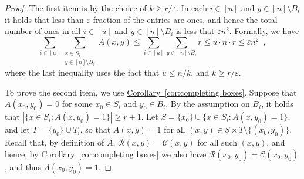 \documentclass[11pt]{article}
\numberwithin{equation}{section}
\theoremstyle{definition}
\theoremstyle{plain}
\newcommand{\expref}[2]{\hyperref[#2]{#1~\ref{#2}}}
\theoremstyle{plain}
\newcommand{\colored}{}
\newcommand{\blocklength}{\colored{n}} %
\newcommand{\degree}{\colored{r}}
\newcommand{\rowpoly}{\colored{\mathcal R}}
\newcommand{\colpoly}{\colored{\mathcal C}}
\newcommand{\numrect}{\colored{u}}
\newcommand{\eps}{\varepsilon}
\newcommand\abs[1]{\colored{\left|#1\right|}}
\begin{document}
    \begin{proof}
        The first item is by the choice of $k \geq \degree/\eps$.
        In each $i \in [\numrect]$ and $y \in [\blocklength] \setminus B_i$ it holds that
        less than $\eps$ fraction of the entries are ones,
        and hence the total number of ones in all $i \in [\numrect]$ and $y \in [\blocklength] \setminus B_i$
        is less that $\eps \blocklength^2$.
        Formally, we have
        \begin{equation*}
        \sum_{i \in [\numrect]} \sum_{\substack{x \in S_i \\ y \in [\blocklength] \setminus B_i}} A(x,y) \leq \sum_{i \in [\numrect]} \sum_{y \in [\blocklength] \setminus B_i} r  \leq u \cdot \blocklength \cdot \degree \leq \eps \blocklength^2 \enspace,
        \end{equation*}
        where the last inequality uses the fact that $u \leq \blocklength/k$, and $k \geq \degree/\eps$.

        To prove the second item, we use \expref{Corollary}{cor:completing boxes}.
        Suppose that $A(x_0,y_0)=0$ for some $x_0 \in S_i$ and $y_0 \in B_i$.
        By the assumption on $B_i$, it holds that $\abs{\{x \in S_i : A(x,y_0) = 1\}} \geq \degree+1$.
        Let $S = \{x_0\} \cup \{x \in S_i : A(x,y_0) = 1\}$,
        and let $T = \{y_0\} \cup T_i$, so that $A(x,y) = 1$ for all
        $(x,y) \in S \times T \setminus \{(x_0,y_0)\}$.
        Recall that, by definition of $A$,
        $\rowpoly(x,y) = \colpoly(x,y)$ for all such $(x,y)$,
        and hence, by \expref{Corollary}{cor:completing boxes}
        we also have $\rowpoly(x_0,y_0) = \colpoly(x_0,y_0)$, and thus $A(x_0,y_0) = 1$.
    \end{proof}
\end{document}
